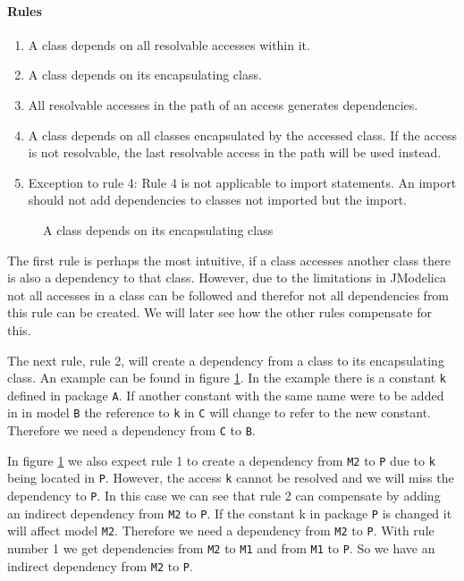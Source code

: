 \documentclass{cslthse-msc}
\begin{document}
\paragraph{Rules}
\begin{enumerate}
\item A class depends on all resolvable accesses within it.
\item A class depends on its encapsulating class. 
\item All resolvable accesses in the path of an access generates dependencies.
\item A class depends on all classes encapsulated by the accessed class. If the access is not resolvable, the last resolvable access in the path will be used instead.
\item Exception to rule 4: Rule 4 is not applicable to import statements. An import should not add dependencies to classes not imported but the import.
\end{enumerate}


\begin{figure}[!htbp]
    \centering
    \qquad
    \subfloat{\raisebox{3.2 cm}{}}
    \caption{A class depends on its encapsulating class}
    \label{fig:parentGraph}
\end{figure}

The first rule is perhaps the most intuitive, if a class accesses another class there is also a dependency to that class. However, due to the limitations in JModelica not all accesses in a class can be followed and therefor not all dependencies from this rule can be created. We will later see how the other rules compensate for this. 

The next rule, rule 2, will create a dependency from a class to its encapsulating class. An example can be found in figure \ref{fig:parentGraph}. In the example there is a constant \texttt{k} defined in package \texttt{A}. If another constant with the same name were to be added in in model \texttt{B} the reference to \texttt{k} in \texttt{C} will change to refer to the new constant. Therefore we need a dependency from \texttt{C} to \texttt{B}.

In figure \ref{fig:parentGraph} we also expect rule 1 to create a dependency from \texttt{M2} to \texttt{P} due to \texttt{k} being located in \texttt{P}. However, the access \texttt{k} cannot be resolved and we will miss the dependency to \texttt{P}. In this case we can see that rule 2 can compensate by adding an indirect dependency from \texttt{M2} to \texttt{P}. 
If the constant k in package \texttt{P} is changed it will affect model \texttt{M2}. Therefore we need a dependency from \texttt{M2} to \texttt{P}. With rule number 1 we get dependencies from \texttt{M2} to \texttt{M1} and from \texttt{M1} to \texttt{P}. So we have an indirect dependency from \texttt{M2} to \texttt{P}.
\end{document}
